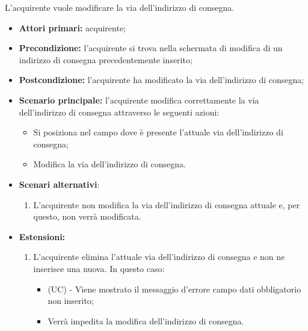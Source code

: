 L'acquirente vuole modificare la via dell'indirizzo di consegna.
\begin{itemize}
    \item \textbf{Attori primari:} acquirente;
    \item \textbf{Precondizione:} l'acquirente si trova nella schermata di modifica di un indirizzo di consegna precedentemente inserito;
    \item \textbf{Postcondizione:} l'acquirente ha modificato la via dell'indirizzo di consegna;
    \item \textbf{Scenario principale:} l'acquirente modifica correttamente la via dell'indirizzo di consegna attraverso le seguenti azioni:
    \begin{itemize}
        \item Si posiziona nel campo dove è presente l'attuale via dell'indirizzo di consegna;
        \item Modifica la via dell'indirizzo di consegna.
    \end{itemize}
    \item \textbf{Scenari alternativi}:
    \begin{enumerate}[label=\lett]
        \item L'acquirente non modifica la via dell'indirizzo di consegna attuale e, per questo, non verrà modificata.
    \end{enumerate}
    \item \textbf{Estensioni:}
    \begin{enumerate}[label=\lett]
        \item L'acquirente elimina l'attuale via dell'indirizzo di consegna e non ne inserisce una nuova. In questo caso:
        \begin{itemize}
            \item (UC) - Viene mostrato il messaggio d'errore campo dati obbligatorio non inserito;
            \item Verrà impedita la modifica dell'indirizzo di consegna.
        \end{itemize}
    \end{enumerate}
\end{itemize}

